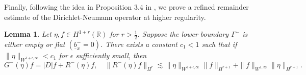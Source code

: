 \documentclass[12pt]{amsart}
\newtheorem{lemma}[theorem]{Lemma}
\theoremstyle{definition}
\numberwithin{equation}{section}
\newcommand{\R}{\mathbb{R}}
\newcommand{\f}{\frac}
\begin{document}
Finally, following the idea in Proposition $3.4$ in \cite{MR4348695}, we prove a refined remainder estimate of the Dirichlet-Neumann operator at higher regularity.
\begin{lemma}\label{t:elliptic}
Let $\eta ,f\in  H^{1+r}(\R)$ for $r>\f12$.
Suppose the lower boundary $\Gamma^-$ is either empty or flat $(\underline{b}^{-}_x = 0)$.
There exists a constant $c_1<1$ such that if
$\|\eta\|_{W^{1+\epsilon,\infty}}<c_1$ for $\epsilon$ sufficiently small, then
\begin{equation} \label{GfDRf2}
G^-(\eta)f = |D|f + R^-(\eta)f, \quad \| R^-(\eta)f\|_{H^{r}} \lesssim \| \eta\|_{W^{1+\epsilon,\infty}} \|f\|_{H^{r+1}} + \| f\|_{W^{1,\infty}} \|\eta\|_{H^{r+1}}.
\end{equation}
\end{lemma}
\end{document}
